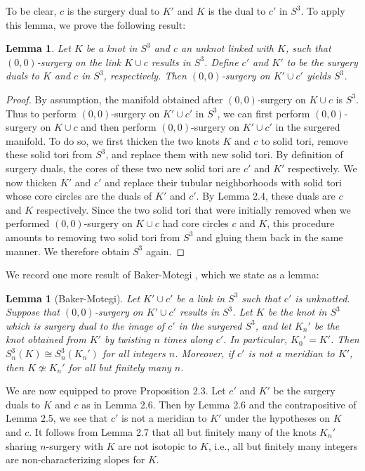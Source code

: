 \documentclass[11pt,usenames,dvipsnames,reqno]{amsart}
\numberwithin{theorem}{section}
\newtheorem{lemma}[theorem]{Lemma}
\theoremstyle{ex}
\theoremstyle{rem}
\begin{document}
To be clear, $c$ is the surgery dual to $K'$ and $K$ is the dual to $c'$ in $S^3$. To apply this lemma, we prove the following result:

\begin{lemma}
	Let $K$ be a knot in $S^3$ and $c$ an unknot linked with $K$, such that $(0,0)$-surgery on the link $K\cup c$ results in $S^3$. Define $c'$ and $K'$ to be the surgery duals to $K$ and $c$ in $S^3$, respectively. Then $(0,0)$-surgery on $K'\cup c'$ yields $S^3$.
\end{lemma}

\begin{proof}
	By assumption, the manifold obtained after $(0,0)$-surgery on $K\cup c$ is $S^3$. Thus to perform $(0,0)$-surgery on $K'\cup c'$ in $S^3$, we can first perform $(0,0)$-surgery on $K\cup c$ and then perform $(0,0)$-surgery on $K'\cup c'$ in the surgered manifold. To do so, we first thicken the two knots $K$ and $c$ to solid tori, remove these solid tori from $S^3$, and replace them with new solid tori. By definition of surgery duals, the cores of these two new solid tori are $c'$ and $K'$ respectively. We now thicken $K'$ and $c'$ and replace their tubular neighborhoods with solid tori whose core circles are the duals of $K'$ and $c'$. By Lemma 2.4, these duals are $c$ and $K$ respectively. Since the two solid tori that were initially removed when we performed $(0,0)$-surgery on $K\cup c$ had core circles $c$ and $K$, this procedure amounts to removing two solid tori from $S^3$ and gluing them back in the same manner. We therefore obtain $S^3$ again.
\end{proof}
	
We record one more result of Baker-Motegi \cite[Theorem 2.1]{baker-motegi}, which we state as a lemma:

\begin{lemma}[Baker-Motegi]
	Let $K'\cup c'$ be a link in $S^3$ such that $c'$ is unknotted. Suppose that $(0,0)$-surgery on $K'\cup c'$ results in $S^3$. Let $K$ be the knot in $S^3$ which is surgery dual to the image of $c'$ in the surgered $S^3$, and let $K_n'$ be the knot obtained from $K'$ by twisting $n$ times along $c'$. In particular, $K_0'=K'$. Then $S^3_n(K)\cong S^3_n(K_n')$ for all integers $n$. Moreover, if $c'$ is not a meridian to $K'$, then $K\not\simeq K_n'$ for all but finitely many $n$.
\end{lemma}

We are now equipped to prove Proposition 2.3. Let $c'$ and $K'$ be the surgery duals to $K$ and $c$ as in Lemma 2.6. Then by Lemma 2.6 and the contrapositive of Lemma 2.5, we see that $c'$ is not a meridian to $K'$ under the hypotheses on $K$ and $c$. It follows from Lemma 2.7 that all but finitely many of the knots $K_n'$ sharing $n$-surgery with $K$ are not isotopic to $K$, i.e., all but finitely many integers are non-characterizing slopes for $K$.
\end{document}
